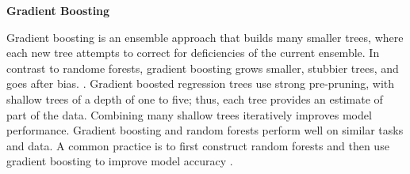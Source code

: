 \documentclass[sigconf]{acmart}
\begin{document}

\textbf{Gradient Boosting}

Gradient boosting is an ensemble approach that builds many smaller trees,  
where each new tree attempts to correct for deficiencies of the current 
ensemble. In contrast to randome forests, gradient boosting grows smaller, 
stubbier trees, and goes after bias. \cite{jamesetal13, kuhn13}. Gradient 
boosted regression trees use strong pre-pruning, with shallow trees of a 
depth of one to five; thus, each tree provides an estimate of part of the 
data. Combining many shallow trees iteratively improves model performance. 
Gradient boosting and random forests perform well on similar tasks and data. 
A common practice is to first construct random forests and then use gradient 
boosting to improve model accuracy \cite{muller17}. 

\end{document}

